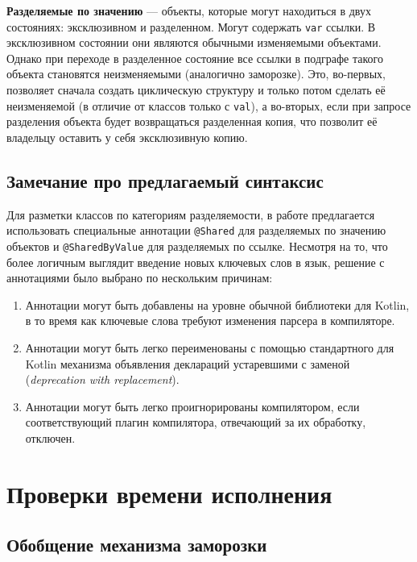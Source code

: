 \documentclass[specification,annotation,times]{itmo-student-thesis}
\begin{document}
\textbf{Разделяемые по значению} --- объекты, которые могут находиться в двух состояниях: эксклюзивном и разделенном. Могут содержать \texttt{var} ссылки.
В эксклюзивном состоянии они являются обычными изменяемыми объектами.
Однако при переходе в разделенное состояние все ссылки в подграфе такого объекта становятся неизменяемыми (аналогично заморозке).
Это, во-первых, позволяет сначала создать циклическую структуру и только потом сделать её неизменяемой (в отличие от классов только с \texttt{val}),
а во-вторых, если при запросе разделения объекта будет возвращаться разделенная копия, что позволит её владельцу оставить у себя эксклюзивную копию.

\subsection{Замечание про предлагаемый синтаксис}\label{syntax_note}

Для разметки классов по категориям разделяемости, в работе предлагается использовать специальные аннотации \texttt{@Shared} для разделяемых по значению объектов и \texttt{@SharedByValue} для разделяемых по ссылке.
Несмотря на то, что более логичным выглядит введение новых ключевых слов в язык, решение с аннотациями было выбрано по нескольким причинам:

\begin{enumerate}
	\item Аннотации могут быть добавлены на уровне обычной библиотеки для Kotlin, в то время как ключевые слова требуют изменения парсера в компиляторе.
	\item Аннотации могут быть легко переименованы с помощью стандартного для Kotlin механизма объявления деклараций устаревшими с заменой (\textit{deprecation with replacement}).
	\item Аннотации могут быть легко проигнорированы компилятором, если соответствующий плагин компилятора, отвечающий за их обработку, отключен.
\end{enumerate}

\section{Проверки времени исполнения}


\subsection{Обобщение механизма заморозки}
\end{document}
